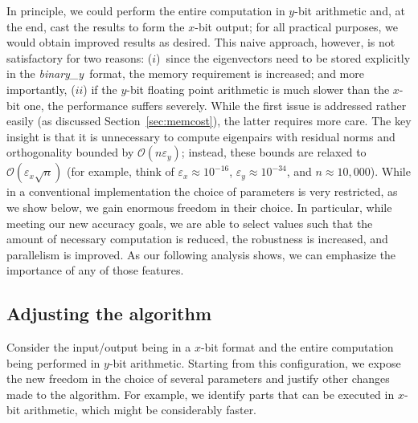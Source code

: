 \documentclass[final]{siamltex}
\newcommand\order[1]{\mathcal{O}(#1)}
\newcommand{\binaryy}{{\it binary\_\hspace*{0pt}y}}
\begin{document}
In principle, we could perform the entire computation in $y$-bit arithmetic
and, at the end, cast the results to form the $x$-bit output; for 
all practical purposes, we would obtain improved results as
desired. This naive approach, however, is not satisfactory for two reasons:
($i$)~since the eigenvectors need to be
stored explicitly in the
\binaryy\ format, the memory requirement is increased; and more importantly,
($ii$) if the $y$-bit floating point 
arithmetic is much slower than the $x$-bit one, the
performance suffers severely. While the first issue is addressed rather
easily (as discussed Section~\ref{sec:memcost}), the latter requires more
care. The key insight is that it is unnecessary to compute eigenpairs with
residual norms and orthogonality bounded by $\order{n \varepsilon_y}$; instead,
these bounds are relaxed to $\order{\varepsilon_x \sqrt{n}}$ (for
example, think of $\varepsilon_x \approx 10^{-16}$, $\varepsilon_y
\approx 10^{-34}$, and $n \approx 10{,}000$). While in a conventional
implementation the choice of parameters is very restricted, as we show below, we gain enormous freedom in their choice. In
particular, while meeting our new accuracy goals, we are able to select values such
that the amount of necessary computation is reduced, the 
robustness is increased, and parallelism is improved. As our following analysis
shows, we can emphasize the importance of any of those features. 

\subsection{Adjusting the algorithm} Consider the input/output being in a
$x$-bit format and the entire computation being performed in
$y$-bit arithmetic. Starting from this configuration, we expose the new
freedom in the choice of several parameters and justify other changes made to the algorithm.
For example, we identify parts that can be executed in $x$-bit
arithmetic, which might be considerably faster. 
\end{document}
